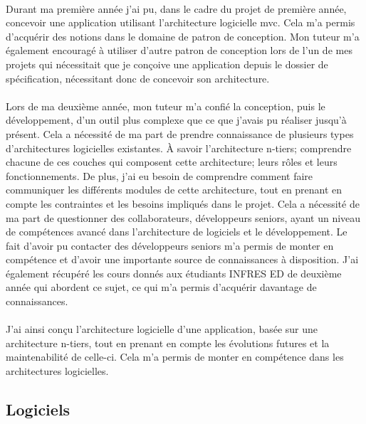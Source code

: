 \documentclass[12pt,a4paper]{report}
\begin{document}
\paragraph*{}Durant ma première année j’ai pu, dans le cadre du projet de première année, concevoir une application utilisant l’architecture logicielle \gls{mvc}. Cela m’a permis d'acquérir des notions dans le domaine de patron de conception. Mon tuteur m’a également encouragé à utiliser d'autre patron de conception lors de l’un de mes projets qui nécessitait que je conçoive une application depuis le dossier de spécification, nécessitant donc de concevoir son architecture.
\paragraph*{}Lors de ma deuxième année, mon tuteur m'a confié la conception, puis le développement, d'un outil plus complexe que ce que j'avais pu réaliser jusqu’à présent. Cela a nécessité de ma part de prendre connaissance de plusieurs types d'architectures logicielles existantes. À savoir l'architecture n-tiers; comprendre chacune de ces couches qui composent cette architecture; leurs rôles et leurs fonctionnements. De plus, j'ai eu besoin de comprendre comment faire communiquer les différents modules de cette architecture, tout en prenant en compte les contraintes et les besoins impliqués dans le projet. Cela a nécessité de ma part de questionner des collaborateurs, développeurs seniors, ayant un niveau de compétences avancé dans l'architecture de logiciels et le développement. Le fait d'avoir pu contacter des développeurs seniors m'a permis de monter en compétence et d'avoir une importante source de connaissances à disposition. J'ai également récupéré les cours donnés aux étudiants INFRES ED de deuxième année qui abordent ce sujet, ce qui m'a permis d'acquérir davantage de connaissances.
\paragraph*{}J'ai ainsi conçu l'architecture logicielle d'une application, basée sur une architecture n-tiers, tout en prenant en compte les évolutions futures et la maintenabilité de celle-ci. Cela m’a permis de monter en compétence dans les architectures logicielles.\\

\subsection{Logiciels}
\end{document}
